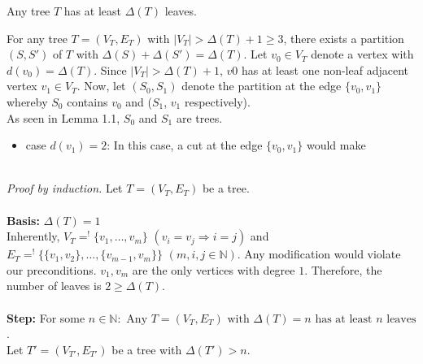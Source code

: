 \documentclass[a4paper]{article}
\begin{document}
\begin{solution}{1}
\begin{theorem}{Any tree $T$ has at least $\Delta(T)$ leaves.}
			\begin{lemma}{For any tree $T =  (V_T, E_T)$ with $|V_T| > \Delta(T)+1 \geq 3$, there exists a partition $(S, S')$  of $T$ with $\Delta(S) + \Delta(S') = \Delta(T)$.}
				Let $v_0 \in V_T$ denote a vertex with $d(v_0) = \Delta(T)$. Since $|V_T| > \Delta(T)+1$, $v0$ has at least one non-leaf adjacent vertex $v_1 \in V_T$. Now, let $(S_0, S_1)$ denote the partition at the edge $\{v_0, v_1\}$ whereby $S_0$ contains $v_0$ and ($S_1$, $v_1$ respectively).\\
				As seen in Lemma 1.1, $S_0$ and $S_1$ are trees.
				\begin{itemize}
					\item case $d(v_1) = 2$: In this case, a cut at the edge $\{v_0, v_1\}$ would make 
				\end{itemize}
			\end{lemma}
			\ \\
			\emph{Proof by induction.} Let $T = (V_T, E_T)$ be a tree.\\ \ \\
			\textbf{Basis: }$\Delta(T)=1$\\
				Inherently, $V_T =^! \{v_1, \dots, v_m\}$ $(v_i = v_j \Rightarrow i=j)$ and $E_T =^! \{\{v_1, v_2\}, ..., \{v_{m-1}, v_m\}\}$ $(m,i,j \in \mathbb{N})$. Any modification would violate our preconditions. $v_1, v_m$ are the only vertices with degree $1$. Therefore, the number of leaves is $2 \geq \Delta(T)$. \ \\
			\ \\
			\textbf{Step: }For some $n \in \mathbb{N}: \text{ Any } T = (V_T, E_T) \text{ with } \Delta(T) = n \text{ has at least } n \text{ leaves}$ .\ \\
			Let $T' = (V_{T'}, E_{T'})$ be a tree with $\Delta(T') > n$.
		\end{theorem}
	\end{solution}
	\newpage
\end{document}
